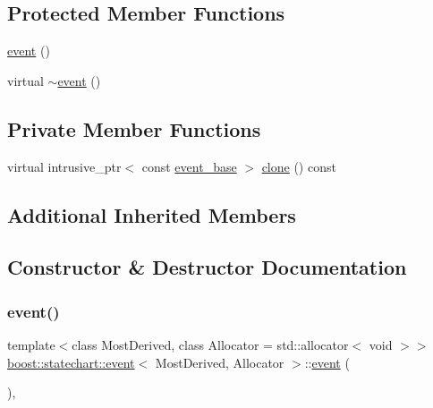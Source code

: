 \subsection*{Protected Member Functions}
\begin{DoxyCompactItemize}
\item 
\mbox{\hyperlink{classboost_1_1statechart_1_1event_ac3d29f01cd8c8c61b0582e7542d976fd}{event}} ()
\item 
virtual \mbox{\hyperlink{classboost_1_1statechart_1_1event_a9b02006f65d2536a90c68feae6b23c76}{$\sim$event}} ()
\end{DoxyCompactItemize}
\subsection*{Private Member Functions}
\begin{DoxyCompactItemize}
\item 
virtual intrusive\+\_\+ptr$<$ const \mbox{\hyperlink{classboost_1_1statechart_1_1event__base}{event\+\_\+base}} $>$ \mbox{\hyperlink{classboost_1_1statechart_1_1event_ad7e8221cf71f8513075e29a64b9ad5b6}{clone}} () const
\end{DoxyCompactItemize}
\subsection*{Additional Inherited Members}


\subsection{Constructor \& Destructor Documentation}
\mbox{\label{classboost_1_1statechart_1_1event_ac3d29f01cd8c8c61b0582e7542d976fd}} 
\subsubsection{\texorpdfstring{event()}{event()}}
{\footnotesize\ttfamily template$<$class Most\+Derived, class Allocator = std\+::allocator$<$ void $>$$>$ \\
\mbox{\hyperlink{classboost_1_1statechart_1_1event}{boost\+::statechart\+::event}}$<$ Most\+Derived, Allocator $>$\+::\mbox{\hyperlink{classboost_1_1statechart_1_1event}{event}} (\begin{DoxyParamCaption}{ }\end{DoxyParamCaption})\hspace{0.3cm}{\ttfamily [inline]}, {\ttfamily [protected]}}


